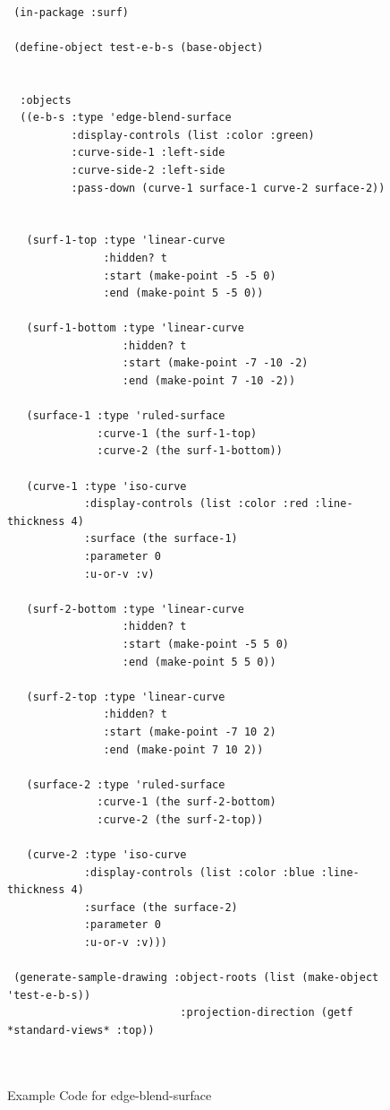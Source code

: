 \documentclass [11pt]{book}
\begin{document}
\begin{itemize}
\begin{figure}
\begin{lrbox}{\boxedverb}
\begin{minipage}{\linewidth}
{\begin{verbatim}

 (in-package :surf)

 (define-object test-e-b-s (base-object)
  
  
  :objects
  ((e-b-s :type 'edge-blend-surface
          :display-controls (list :color :green)
          :curve-side-1 :left-side
          :curve-side-2 :left-side
          :pass-down (curve-1 surface-1 curve-2 surface-2))
                                    
   
   (surf-1-top :type 'linear-curve
               :hidden? t
               :start (make-point -5 -5 0)
               :end (make-point 5 -5 0))
    
   (surf-1-bottom :type 'linear-curve
                  :hidden? t
                  :start (make-point -7 -10 -2)
                  :end (make-point 7 -10 -2))
    
   (surface-1 :type 'ruled-surface
              :curve-1 (the surf-1-top)
              :curve-2 (the surf-1-bottom))
    
   (curve-1 :type 'iso-curve
            :display-controls (list :color :red :line-thickness 4)
            :surface (the surface-1)
            :parameter 0
            :u-or-v :v)
    
   (surf-2-bottom :type 'linear-curve
                  :hidden? t
                  :start (make-point -5 5 0)
                  :end (make-point 5 5 0))
    
   (surf-2-top :type 'linear-curve
               :hidden? t
               :start (make-point -7 10 2)
               :end (make-point 7 10 2))
    
   (surface-2 :type 'ruled-surface
              :curve-1 (the surf-2-bottom)
              :curve-2 (the surf-2-top))
    
   (curve-2 :type 'iso-curve
            :display-controls (list :color :blue :line-thickness 4)
            :surface (the surface-2)
            :parameter 0
            :u-or-v :v)))

 (generate-sample-drawing :object-roots (list (make-object 'test-e-b-s))
                           :projection-direction (getf *standard-views* :top))

 
\end{verbatim}}
\end{minipage}
\end{lrbox}
\fbox{\usebox{\boxedverb}}

\caption{Example Code for edge-blend-surface}


\end{figure}
\end{itemize}
\end{document}
